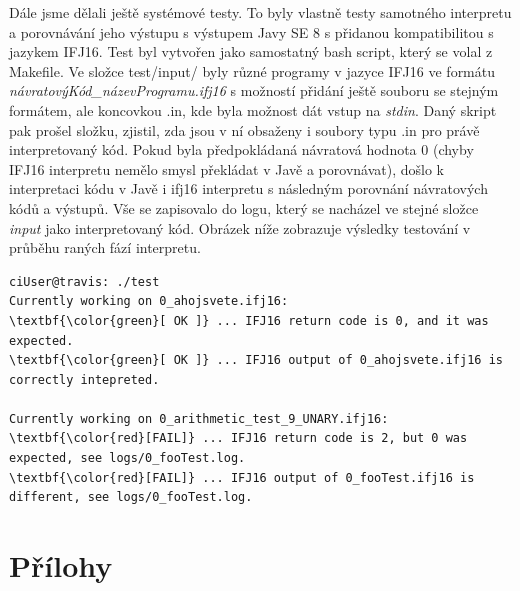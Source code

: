 \documentclass[a4paper,11pt]{article}
\begin{document}
Dále jsme dělali ještě systémové testy. To byly vlastně testy samotného interpretu a porovnávání jeho výstupu s výstupem Javy SE 8 s přidanou kompatibilitou s jazykem IFJ16. Test byl vytvořen jako samostatný bash script, který se volal z Makefile. Ve složce test/input/ byly různé programy v jazyce IFJ16 ve formátu \textit{návratovýKód\_názevProgramu.ifj16} s možností přidání ještě souboru se stejným formátem, ale koncovkou .in, kde byla možnost dát vstup na \textit{stdin}. Daný skript pak prošel složku, zjistil, zda jsou v ní obsaženy i soubory typu .in pro právě interpretovaný kód. Pokud byla předpokládaná návratová hodnota 0 (chyby IFJ16 interpretu nemělo smysl překládat v Javě a porovnávat), došlo k interpretaci kódu v Javě i ifj16 interpretu s následným porovnání návratových kódů a výstupů. Vše se zapisovalo do logu, který se nacházel ve stejné složce \textit{input} jako interpretovaný kód. Obrázek níže zobrazuje výsledky testování v průběhu raných fází interpretu.\\


\begin{Verbatim}
ciUser@travis: ./test
Currently working on 0_ahojsvete.ifj16:
\textbf{\color{green}[ OK ]} ... IFJ16 return code is 0, and it was expected.
\textbf{\color{green}[ OK ]} ... IFJ16 output of 0_ahojsvete.ifj16 is correctly intepreted.

Currently working on 0_arithmetic_test_9_UNARY.ifj16:
\textbf{\color{red}[FAIL]} ... IFJ16 return code is 2, but 0 was expected, see logs/0_fooTest.log.
\textbf{\color{red}[FAIL]} ... IFJ16 output of 0_fooTest.ifj16 is different, see logs/0_fooTest.log.
\end{Verbatim}

\section{Přílohy}
\end{document}
